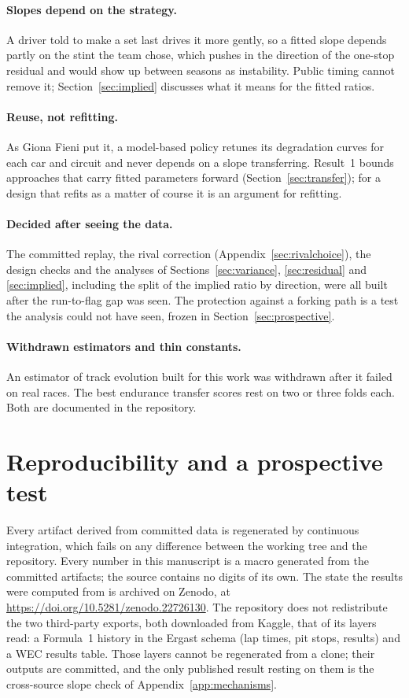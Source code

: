 \documentclass[11pt,a4paper]{article}
\begin{document}
\paragraph{Slopes depend on the strategy.} A driver told to make a set last
drives it more gently, so a fitted slope depends partly on the stint the team
chose, which pushes in the direction of the one-stop residual and would show up
between seasons as instability. Public timing cannot remove it;
Section~\ref{sec:implied} discusses what it means for the fitted ratios.

\paragraph{Reuse, not refitting.} As Giona Fieni put it, a model-based policy
retunes its degradation curves for each car and circuit and never depends on a
slope transferring. Result~1 bounds approaches that carry fitted parameters
forward (Section~\ref{sec:transfer}); for a design that refits as a matter of
course it is an argument for refitting.

\paragraph{Decided after seeing the data.} The committed replay, the rival
correction (Appendix~\ref{sec:rivalchoice}), the design checks and the analyses of Sections~\ref{sec:variance},
\ref{sec:residual} and \ref{sec:implied}, including the split of the implied
ratio by direction, were all built after the run-to-flag gap was seen. The protection against a forking path is a test the analysis could not
have seen, frozen in Section~\ref{sec:prospective}.

\paragraph{Withdrawn estimators and thin constants.} An estimator of track
evolution built for this work was withdrawn after it failed on real races. The
best endurance transfer scores rest on two or three folds each. Both are
documented in the repository.

\section{Reproducibility and a prospective test}
\label{sec:reproducibility}

Every artifact derived from committed data is regenerated by continuous
integration, which fails on any difference between the working tree and the
repository. Every number in this manuscript is a macro generated from the
committed artifacts; the source contains no digits of its own. The state the
results were computed from is archived on Zenodo, at
\url{https://doi.org/10.5281/zenodo.22726130}.
The repository does not redistribute the two third-party exports, both
downloaded from Kaggle, that \NBlockedLayers{} of its layers read: a Formula~1
history in the Ergast schema (lap times, pit stops, results) and a WEC results
table. Those layers cannot be regenerated from a clone; their outputs are
committed, and the only published result resting on them is the cross-source
slope check of Appendix~\ref{app:mechanisms}.
\end{document}
